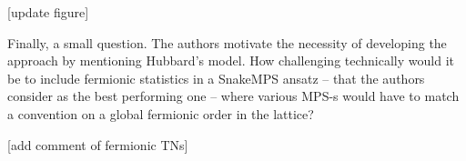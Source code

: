 \documentclass[a4paper,12pt]{article}
\newenvironment{referee}[1]
{\noindent {\bf Referee #1}}
{\vspace{1em}}
\newenvironment{response}
{\noindent \color{blue!40!black}{\bf Response}}
{\vspace{1em}}
\begin{document}
\begin{response}
	[update figure]
\end{response}

\begin{referee}{B}
	Finally, a small question.
	The authors motivate the necessity of developing the approach by mentioning Hubbard's model.
	How challenging technically would it be to include fermionic statistics in a SnakeMPS ansatz -- that the authors consider as the best performing one -- where various MPS-s would have to match a convention on a global fermionic order in the lattice?
\end{referee}

\begin{response}
	[add comment of fermionic TNs]
\end{response}
\end{document}
